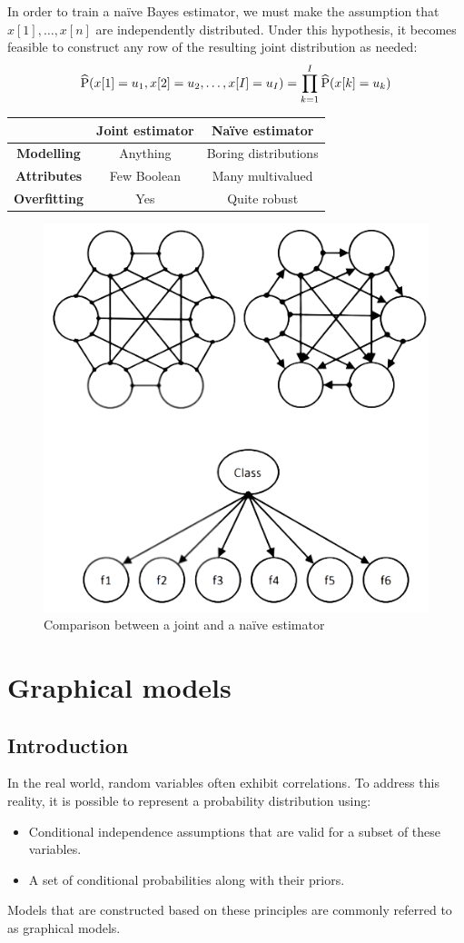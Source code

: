 \documentclass[12pt, a4paper]{report}
\begin{document}
    In order to train a naïve Bayes estimator, we must make the assumption that $x[1],\dots,x[n]$ are independently distributed. 
    Under this hypothesis, it becomes feasible to construct any row of the resulting joint distribution as needed:
    \[\widehat{\textnormal{P}}(x[1]=u_1,x[2]=u_2,\dots,x[I]=u_I) = \prod_{k=1}^{I} \widehat{\textnormal{P}}(x[k]=u_k)\]
    \begin{table}[H]
        \centering
        \begin{tabular}{c|c|c|}
        \cline{2-3}
                                                   & \textbf{Joint estimator} & \textbf{Naïve estimator} \\ \hline
        \multicolumn{1}{|c|}{\textbf{Modelling}}   & Anything                 & Boring distributions     \\ 
        \multicolumn{1}{|c|}{\textbf{Attributes}}  & Few Boolean              & Many multivalued         \\ 
        \multicolumn{1}{|c|}{\textbf{Overfitting}} & Yes                      & Quite robust             \\ \hline
        \end{tabular}
    \end{table}
    \begin{figure}[H]
        \centering
        \includegraphics[width=0.35\linewidth]{images/naive-joint.png}
        \caption{Comparison between a joint and a naïve estimator}
    \end{figure}

\newpage

\chapter{Graphical models}
    \section{Introduction}
    In the real world, random variables often exhibit correlations. To address this reality, it is possible to represent a probability distribution using:
    \begin{itemize}
        \item Conditional independence assumptions that are valid for a subset of these variables.
        \item A set of conditional probabilities along with their priors.
    \end{itemize}
    Models that are constructed based on these principles are commonly referred to as graphical models.
\end{document}
